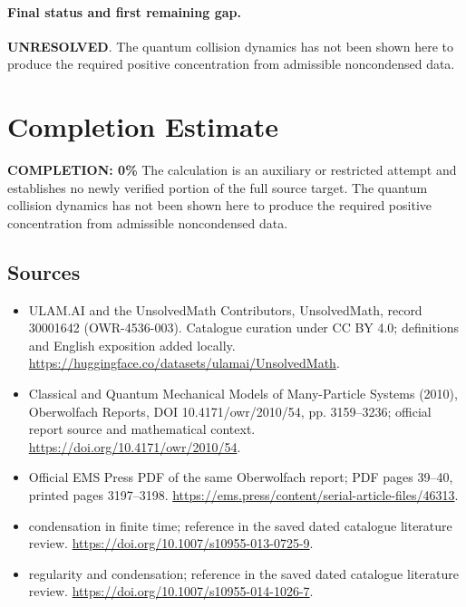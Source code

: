 \documentclass[11pt]{article}
\begin{document}
\paragraph{Final status and first remaining gap.}
\textbf{UNRESOLVED}. The quantum collision dynamics has not been shown here to produce the required positive concentration from admissible noncondensed data.

\section{Completion Estimate}
\noindent\textbf{COMPLETION: 0\%}
The calculation is an auxiliary or restricted attempt and establishes no newly verified portion of the full source target. The quantum collision dynamics has not been shown here to produce the required positive concentration from admissible noncondensed data.

\subsection{Sources}
\begin{itemize}
\item[\hypertarget{source:30001642:1}{S1}] ULAM.AI and the UnsolvedMath Contributors, UnsolvedMath, record 30001642 (OWR-4536-003). Catalogue curation under CC BY 4.0; definitions and English exposition added locally.
\url{https://huggingface.co/datasets/ulamai/UnsolvedMath}.
\item[\hypertarget{source:30001642:2}{S2}] Classical and Quantum Mechanical Models of Many-Particle Systems (2010), Oberwolfach Reports, DOI 10.4171/owr/2010/54, pp. 3159--3236; official report source and mathematical context.
\url{https://doi.org/10.4171/owr/2010/54}.
\item[\hypertarget{source:30001642:3}{S3}] Official EMS Press PDF of the same Oberwolfach report; PDF pages 39--40, printed pages 3197--3198.
\url{https://ems.press/content/serial-article-files/46313}.
\item[\hypertarget{source:30001642:4}{S4}] condensation in finite time; reference in the saved dated catalogue literature review.
\url{https://doi.org/10.1007/s10955-013-0725-9}.
\item[\hypertarget{source:30001642:5}{S5}] regularity and condensation; reference in the saved dated catalogue literature review.
\url{https://doi.org/10.1007/s10955-014-1026-7}.
\end{itemize}
\label{end:30001642}
\end{document}
